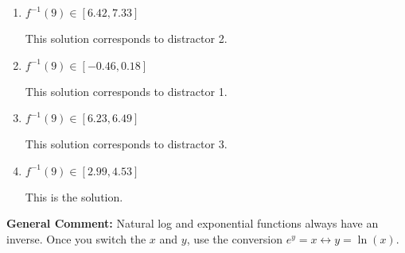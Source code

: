 \documentclass{extbook}[14pt]
\begin{document}
\begin{enumerate}
{\begin{enumerate}[label=\Alph*.]
 This solution corresponds to distractor 4.
\item \( f^{-1}(9) \in [6.42, 7.33] \)

 This solution corresponds to distractor 2.
\item \( f^{-1}(9) \in [-0.46, 0.18] \)

 This solution corresponds to distractor 1.
\item \( f^{-1}(9) \in [6.23, 6.49] \)

 This solution corresponds to distractor 3.
\item \( f^{-1}(9) \in [2.99, 4.53] \)

 This is the solution.
\end{enumerate}

\textbf{General Comment:} Natural log and exponential functions always have an inverse. Once you switch the $x$ and $y$, use the conversion $ e^y = x \leftrightarrow y=\ln(x)$.
}
\end{enumerate}
\end{document}
